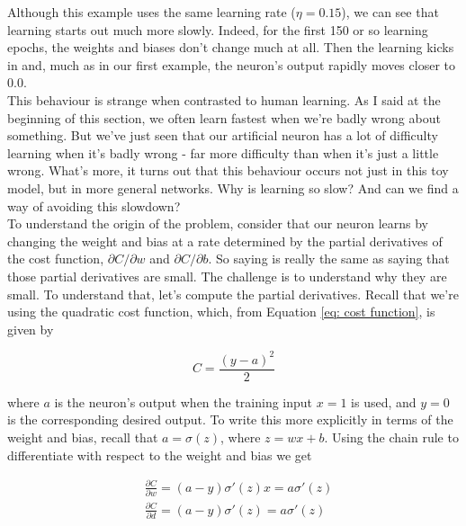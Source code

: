 \documentclass[a4paper,11pt,twoside]{report}
\begin{document}
Although this example uses the same learning rate ($\eta=0.15$), we can see that learning starts out much more slowly. Indeed, for the first 150 or so learning epochs, the weights and biases don't change much at all. Then the learning kicks in and, much as in our first example, the neuron's output rapidly moves closer to 0.0.\\

This behaviour is strange when contrasted to human learning. As I said at the beginning of this section, we often learn fastest when we're badly wrong about something. But we've just seen that our artificial neuron has a lot of difficulty learning when it's badly wrong - far more difficulty than when it's just a little wrong. What's more, it turns out that this behaviour occurs not just in this toy model, but in more general networks. Why is learning so slow? And can we find a way of avoiding this slowdown?\\

To understand the origin of the problem, consider that our neuron learns by changing the weight and bias at a rate determined by the partial derivatives of the cost function, $\partial C/\partial w$ and $\partial C/\partial b$. So saying  is really the same as saying that those partial derivatives are small. The challenge is to understand why they are small. To understand that, let's compute the partial derivatives. Recall that we're using the quadratic cost function, which, from Equation \ref{eq: cost function}, is given by

\begin{equation}
C=\frac{(y-a)^2}{2}
\label{eq: cost function quad 1 neuron}
\end{equation}

where $a$ is the neuron's output when the training input $x=1$ is used, and $y=0$ is the corresponding desired output. To write this more explicitly in terms of the weight and bias, recall that $a=\sigma(z)$, where $z=wx+b$. Using the chain rule to differentiate with respect to the weight and bias we get

\begin{equation}
\begin{aligned}
&\frac{\partial C}{\partial w}=(a-y)\sigma'(z)x=a\sigma'(z)\\
&\frac{\partial C}{\partial d}=(a-y)\sigma'(z)=a\sigma'(z)
\end{aligned}
\label{eq: cost function quad 1 neuron}
\end{equation}
\end{document}
